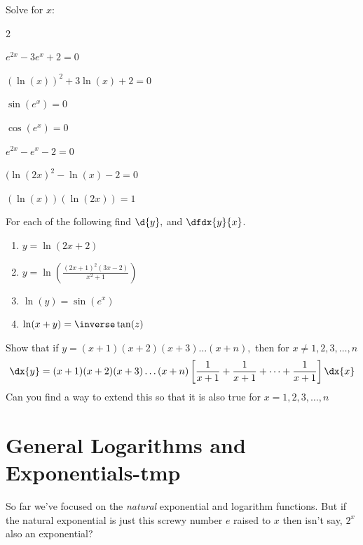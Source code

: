 \begin{ProblemSection}
\begin{myproblem}
  Solve for $x$:
  \begin{enumerate}[label={\bf{}(\alph*)}]
    \begin{multicols}{2}
    \item $e^{2x}-3e^x+2=0$
    \item $(\ln(x))^2+3\ln(x)+2=0$
    \item $\sin(e^x)=0$
    \item $\cos(e^x)=0$
    \item $e^{2x}- e^x-2=0$
    \item $(\ln(2x)^2- \ln(x)-2=0$
    \item $(\ln(x))(\ln(2x))=1$
    \end{multicols}
  \end{enumerate}
\end{myproblem}

\begin{myproblem}{}
  For each of the following find $\d{y},$  and $\dfdx{y}{x}$.
  \begin{enumerate}[label={\bf{}(\alph*)}]{}
  \item $y=\ln(2x+2)$
  \item $y=\ln
    \left(
      \frac{(2x+1)^2(3x-2)}{x^2+1}
    \right)$  
  \item $\ln(y)=\sin(e^x)$
  \item $\ln(x+y)=\inverse\tan(z)$
  \end{enumerate}
\end{myproblem}

\begin{myproblem}
  Show that if $y=(x+1)(x+2)(x+3)\ldots(x+n),$ then for $x\neq1, 2,
  3, \ldots, n$
  $$
  \dx{y}=(x+1)(x+2)(x+3)\ldots(x+n)\left[\frac{1}{x+1}+\frac{1}{x+1}+\cdots+\frac{1}{x+1}\right]\dx{x}$$
  Can you find a way to extend this so that it is also true for $x=1, 2,
  3, \ldots, n$
  
  \noindent{}
\end{myproblem}
\end{ProblemSection}

 
   
\section{General Logarithms and Exponentials-tmp}
\label{sec:gener-logar-expon}
So far we've focused on the \emph{natural} exponential and logarithm
functions. But if the natural exponential is just this screwy number
$e$ raised to $x$ then isn't say, $2^x$ also an exponential?

